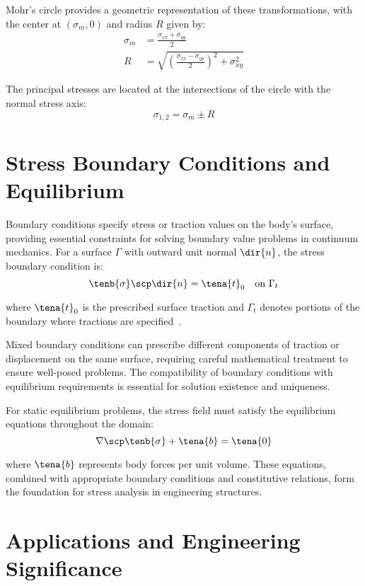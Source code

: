 Mohr's circle provides a geometric representation of these transformations, with the center at $(\sigma_m, 0)$ and radius $R$ given by:
\begin{align}
\sigma_m &= \frac{\sigma_{xx} + \sigma_{yy}}{2}\\
R &= \sqrt{\left(\frac{\sigma_{xx} - \sigma_{yy}}{2}\right)^2 + \sigma_{xy}^2}
\end{align}

The principal stresses are located at the intersections of the circle with the normal stress axis:
\begin{equation}
\sigma_{1,2} = \sigma_m \pm R
\end{equation}

\section{Stress Boundary Conditions and Equilibrium}

Boundary conditions specify stress or traction values on the body's surface, providing essential constraints for solving boundary value problems in continuum mechanics. For a surface $\Gamma$ with outward unit normal $\dir{n}$, the stress boundary condition is:
\begin{equation}
\tenb{\sigma} \scp \dir{n} = \tena{t}_0 \quad \text{on } \Gamma_t
\end{equation}

where $\tena{t}_0$ is the prescribed surface traction and $\Gamma_t$ denotes portions of the boundary where tractions are specified~\autocite{Sadd.2019}.

Mixed boundary conditions can prescribe different components of traction or displacement on the same surface, requiring careful mathematical treatment to ensure well-posed problems. The compatibility of boundary conditions with equilibrium requirements is essential for solution existence and uniqueness.

For static equilibrium problems, the stress field must satisfy the equilibrium equations throughout the domain:
\begin{equation}
\nabla \scp \tenb{\sigma} + \tena{b} = \tena{0}
\end{equation}

where $\tena{b}$ represents body forces per unit volume. These equations, combined with appropriate boundary conditions and constitutive relations, form the foundation for stress analysis in engineering structures.

\section{Applications and Engineering Significance}

